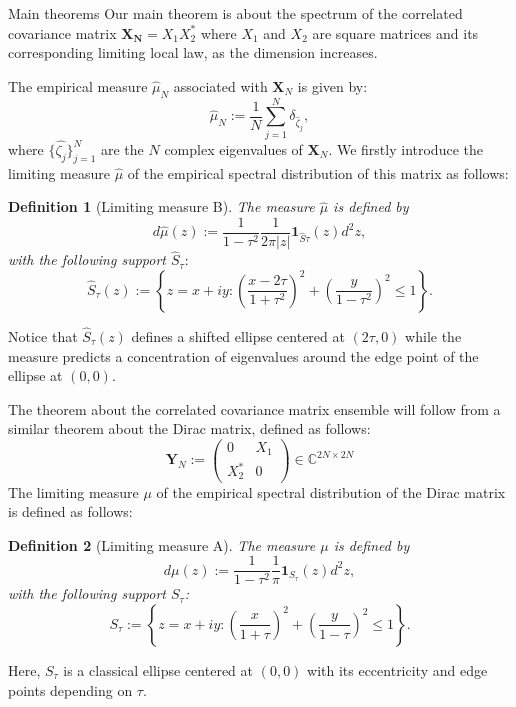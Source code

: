 \documentclass[11pt, a4paper, oneside]{book}
\numberwithin{equation}{chapter}
\newcommand{\beq}{\begin{equation}}
\newcommand{\eeq}{\end{equation}}
\newtheorem{definition}{Definition}[section]
\begin{document}
\begin{section}{Main theorems}
%
Our main theorem is about the spectrum of the correlated covariance matrix $\mathbf{X_N}=X_1X_2^*$ where $X_1$ and $X_2$ are square matrices and its corresponding limiting local law, as the dimension increases.

The empirical measure $\widehat{\mu}_N$ associated with $\mathbf{X}_N$ is given by:
%
$$ \widehat{\mu}_N := \frac{1}{N} \sum \limits_{j=1}^N \delta_{\widehat{\zeta}_j},$$
%
where $ \{ \widehat{\zeta_j} \}_{j=1}^N $ are the $N$ complex eigenvalues of $\mathbf{X}_N.$
%
We firstly introduce the limiting measure $\widehat{\mu}$ of the empirical spectral distribution of this matrix as follows:
%
\begin{definition}[Limiting measure B] The measure $\widehat{\mu}$ is defined by
\beq \label{measure1}
    d\widehat{\mu}(z) := \frac{1}{1-\tau^2}\frac{1}{2\pi|z|} \mathbf{1}_{\widehat{S}\tau}(z) d^2 z,
\eeq
with the following support $\widehat{S}_\tau:$
\beq \label{supp1}
\widehat{S}_\tau(z) := \left \{ z=x+iy : \left ( \frac{
x-2\tau}{1+\tau^2} \right )^2 + \left ( \frac{y}{1-\tau^2}\right )^2 \leq 1 \right \}.
\eeq
\end{definition}
%
Notice that $\widehat{S}_\tau(z)$ defines a shifted ellipse centered at $(2\tau,0)$ while the measure predicts a concentration of eigenvalues around the edge point of the ellipse at $(0,0).$

The theorem about the correlated covariance matrix ensemble will follow from a similar theorem about the Dirac matrix, defined as follows:
%
$$ \mathbf{Y}_N := \begin{pmatrix} 0 & X_1 \\ X_2^* & 0 \end{pmatrix} \in \mathbb{C}^{2N \times 2N}$$
%
The limiting measure $\mu$ of the empirical spectral distribution of the Dirac matrix is defined as follows:
%
\begin{definition}[Limiting measure A] The measure $\mu$ is defined by
\beq \label{measure2}
d\mu(z) := \frac{1}{1-\tau^2} \frac{1}{\pi} \mathbf{1}_{S_{\tau}}(z) d^2 z,
\eeq
 with the following support $S_\tau$:
 \beq \label{supp2}
 S_\tau := \left \{ z=x+iy: \left (\frac{x}{1+\tau} \right )^2 + \left ( \frac{y}{1-\tau}\right )^2 \leq 1 \right \}.
 \eeq
\end{definition}
%
Here, $S_\tau$ is a classical ellipse centered at $(0,0)$ with its eccentricity and edge points depending on $\tau.$


\end{section}
\end{document}
